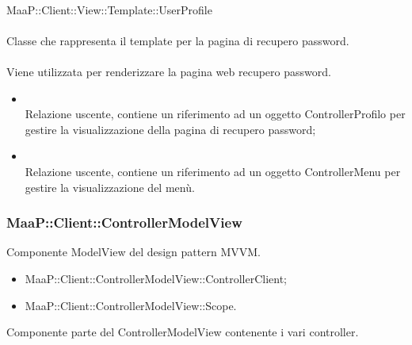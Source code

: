 	\\
	MaaP::Client::View::Template::UserProfile\\
	\\
	Classe che rappresenta il template per la pagina di recupero password.\\
	\\
	Viene utilizzata per renderizzare la pagina web recupero password.
	\begin{itemize}
	\item{}\\
	Relazione uscente, contiene un riferimento ad un oggetto ControllerProfilo per gestire la visualizzazione della pagina di recupero password;
	\item{}\\
	Relazione uscente, contiene un riferimento ad un oggetto ControllerMenu per gestire la visualizzazione del menù.
	\end{itemize}

\subsubsection{MaaP::Client::ControllerModelView}
Componente ModelView del design pattern MVVM.
\begin{itemize}
\item MaaP::Client::ControllerModelView::ControllerClient;
\item MaaP::Client::ControllerModelView::Scope.
\end{itemize}

Componente parte del ControllerModelView contenente i vari controller.

